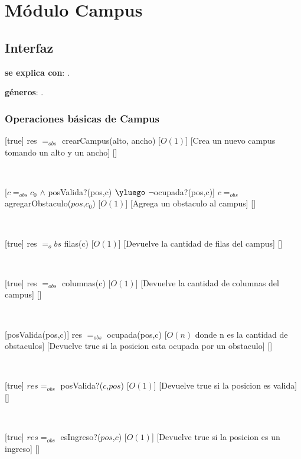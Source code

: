 \section{Módulo Campus}

\subsection{Interfaz}

\textbf{se explica con}: .

\textbf{géneros}: .

\subsubsection{Operaciones básicas de Campus}

[true]
{res $=_{obs}$ crearCampus(alto, ancho)}
[$O(1)$]
[Crea un nuevo campus tomando un alto y un ancho]
[]

~

[$c =_{obs} c_0$ $\land$ posValida?(pos,c) $\yluego$ $\neg$ocupada?(pos,c)]
{$c =_{obs}$ agregarObstaculo($pos$,$c_0$)}
[$O(1)$]
[Agrega un obstaculo al campus]
[]

~

[true]
{res $=_obs$ filas(c)}
[$O(1)$]
[Devuelve la cantidad de filas del campus]
[]

~

[true]
{res $=_{obs}$ columnas(c)}
[$O(1)$]
[Devuelve la cantidad de columnas del campus]
[]

~


[posValida(pos,c)]
{res $=_{obs}$ ocupada(pos,c)}
[$O(n)$ donde n es la cantidad de obstaculos]
[Devuelve true si la posicion esta ocupada por un obstaculo]
[]

~

[true]
{$res =_{obs}$ posValida?($c$,$pos$)}
[$O(1)$]
[Devuelve true si la posicion es valida]
[]

~

[true]
{$res =_{obs}$ esIngreso?($pos$,$c$)}
[$O(1)$]
[Devuelve true si la posicion es un ingreso]
[]

